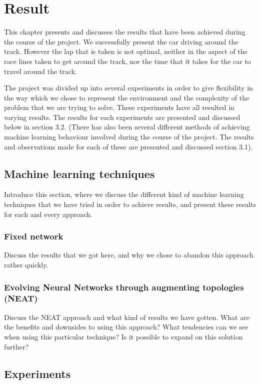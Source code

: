 \chapter{Result}
This chapter presents and discusses the results that have been achieved during the course of the project. We successfully present the car driving around the track. However the lap that is taken is not optimal, neither in the aspect of the race lines taken to get around the track, nor the time that it takes for the car to travel around the track.

The project was divided up into several experiments in order to give flexibility in the way which we chose to represent the environment and the complexity of the problem that we are trying to solve. These experiments have all resulted in varying results. The results for each experiments are presented and discussed below in section 3.2. (There has also been several different methods of achieving machine learning behaviour involved during the course of the project. The results and observations made for each of these are presented and discussed section 3.1).

\section{Machine learning techniques}
Introduce this section, where we discuss the different kind of machine learning techniques that we have tried in order to achieve results, and present these results for each and every approach.

\subsection{Fixed network}
Discuss the results that we got here, and why we chose to abandon this approach rather quickly.

\subsection{Evolving Neural Networks through augmenting topologies (NEAT)}
Discuss the NEAT approach and what kind of results we have gotten. What are the benefits and downsides to using this approach? What tendencies can we see when using this particular technique? Is it possible to expand on this solution further?

\section{Experiments}

